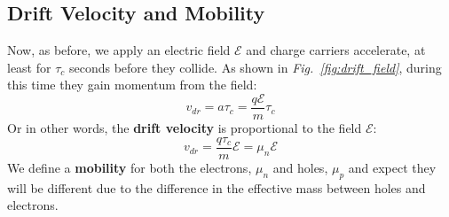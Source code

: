 \subsection{Drift Velocity and Mobility}
Now, as before, we apply an electric field $\mathcal{E}$ and charge carriers accelerate, at least for  $\tau_c$ seconds before they collide.
As shown in \emph{Fig.~\ref{fig:drift_field}}, during this time they gain momentum from the field:
    \begin{equation}
        v_{dr} = a \tau_c = \frac{q \mathcal{E}}{m} \tau_c
    \end{equation}
Or in other words, the \textbf{drift velocity} is proportional to the field $\mathcal{E}$:
    \begin{equation}
        v_{dr} = \frac{q \tau_c}{m} \mathcal{E} = \mu_n \mathcal{E}
    \end{equation}
We define a \textbf{mobility} for both the electrons, $\mu_n$ and holes, $\mu_p$ and expect they will be different due to the difference in the effective mass between holes and electrons.
